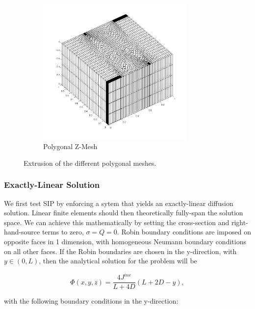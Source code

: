 \begin{figure}
\begin{subfigure}[b]{0.45\textwidth}
		\includegraphics[width=0.85\textwidth]{figures/sec_DSA/SIP_z_poly_extruded_mesh.png}
		\caption{Polygonal Z-Mesh}
	\end{subfigure}
\caption{Extrusion of the different polygonal meshes.}
\label{fig::SIP_mesh_extruded}
\end{figure}

\subsubsection{Exactly-Linear Solution}
\label{sec::DSA_Results_SIP_Linear}

We first test SIP by enforcing a sytem that yields an exactly-linear diffusion solution. Linear finite elements should then theoretically fully-span the solution space. We can achieve this mathematically by setting the cross-section and right-hand-source terms to zero, $\sigma = Q = 0$. Robin boundary conditions are imposed on opposite faces in 1 dimension, with homogeneous Neumann boundary conditions on all other faces. If the Robin boundaries are chosen in the y-direction, with $y \in (0,L)$, then the analytical solution for the problem will be 

\begin{equation}
\label{eq::SIP_mms_lin_solution}
\Phi(x,y,z) = \frac{4 J^{inc}}{L + 4D} \left(  L + 2 D - y \right),
\end{equation}

\noindent with the following boundary conditions in the y-direction:

